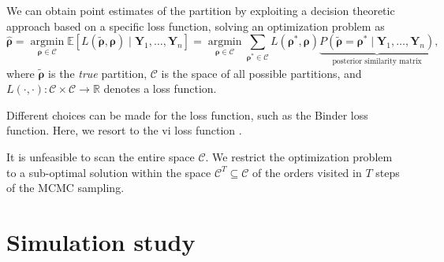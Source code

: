 We can obtain point estimates of the partition by exploiting a decision theoretic approach based on a specific loss function, solving an optimization problem as
\[
    \hat{\bm{\rho}}=\underset{\bm{\rho} \in \mathcal{C}}{\operatorname{argmin}} \mathbb{E}\left[L\left(\tilde{\bm{\rho}}, \bm{\rho}\right) \mid \bm{Y}_1, \ldots, \bm{Y}_n \right]=\underset{\bm{\rho} \in \mathcal{C}}{\operatorname{argmin}} \sum_{\bm{\rho}^* \in \mathcal{C}} L\left(\bm{\rho}^*, \bm{\rho}\right) \underbrace{P\left(\tilde{\bm{\rho}}=\bm{\rho}^* \mid \bm{Y}_1, \ldots, \bm{Y}_n\right)}_{\text{posterior similarity matrix}},
\]
where $\tilde{\bm{\rho}}$ is the \emph{true} partition, $\mathcal{C}$ is the space of all possible partitions, and $L(\cdot, \cdot): \mathcal{C} \times \mathcal{C} \rightarrow \mathbb{R}$ denotes a loss function.

Different choices can be made for the loss function, such as the Binder loss function. Here, we resort to the \gls{vi} loss function \parencite{Meila2007Comparing}.

It is unfeasible to scan the entire space $\mathcal{C}$. We restrict the optimization problem to a sub-optimal solution within the space $\mathcal{C}^T \subseteq \mathcal{C}$ of the orders visited in $T$ steps of the MCMC sampling.


\section{Simulation study}

